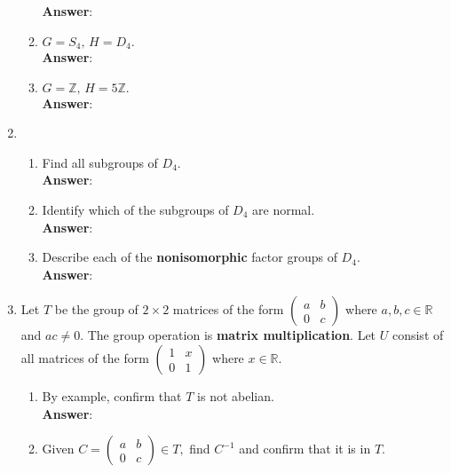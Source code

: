 \documentclass[12pt]{article}
\renewcommand{\emph}[1]{\textsf{\textbf{#1}}}
\newcommand{\bbZ}{\mathbb{Z}}
\newcommand{\bbR}{\mathbb{R}}
\begin{document}
\begin{enumerate}
\begin{enumerate}
	\textbf{Answer}:  \\
	\vfill
	\item $G=S_4, \, H=D_4.$  \\
	
	\textbf{Answer}: \\
	\vfill
	 \item $G=\bbZ, \, H=5 \bbZ.$  \\
	
	\textbf{Answer}:  \\
	\vfill
	\end{enumerate}

\item 
	\begin{enumerate}
	\item Find all subgroups of $D_4.$\\
	\textbf{Answer}: \\
	\vfill
	\item Identify which of the subgroups of $D_4$ are normal.\\
	\textbf{Answer}: \\
	\vfill
	\item Describe each of the \emph{nonisomorphic} factor groups of $D_4.$\\
	\textbf{Answer}: \\
	\vfill
	\end{enumerate}
\newpage
\item Let $T$ be the group of $2 \times 2$ matrices of the form $\begin{pmatrix} a&b\\0&c \end{pmatrix}$ where $a,b,c \in \bbR$ and $ac \not=0.$ The group operation is \emph{matrix multiplication}. Let $U$ consist of all matrices of the form $\begin{pmatrix} 1&x\\0&1 \end{pmatrix}$ where $x \in \bbR.$
	\begin{enumerate}
	\item By example, confirm that $T$ is not abelian.\\
	
	\textbf{Answer}: 
	
	\item Given $C=\begin{pmatrix} a&b\\0&c \end{pmatrix} \in T,$ find $C^{-1}$ and confirm that it is in $T.$\\
	

\end{enumerate}
\end{enumerate}
\end{document}
